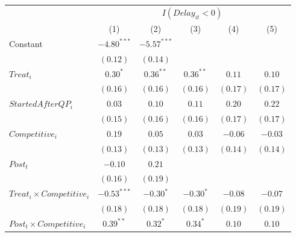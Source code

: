 \documentclass[
]{article}
\begin{document}
\begin{table}
\begin{center}
\begin{tabular}{l c c c c c}
\hline
 & \multicolumn{5}{c}{$I(Delay_{it}<0)$} \\
\cline{2-6}
 & (1) & (2) & (3) & (4) & (5) \\
\hline
Constant                                                             & $-4.80^{***}$ & $-5.57^{***}$ &             &             &             \\
                                                                     & $(0.12)$      & $(0.14)$      &             &             &             \\
$Treat_i$                                                            & $0.30^{*}$    & $0.36^{**}$   & $0.36^{**}$ & $0.11$      & $0.10$      \\
                                                                     & $(0.16)$      & $(0.16)$      & $(0.16)$    & $(0.17)$    & $(0.17)$    \\
$StartedAfterQP_i$                                                   & $0.03$        & $0.10$        & $0.11$      & $0.20$      & $0.22$      \\
                                                                     & $(0.15)$      & $(0.16)$      & $(0.16)$    & $(0.17)$    & $(0.17)$    \\
$Competitive_i$                                                      & $0.19$        & $0.05$        & $0.03$      & $-0.06$     & $-0.03$     \\
                                                                     & $(0.13)$      & $(0.13)$      & $(0.13)$    & $(0.14)$    & $(0.14)$    \\
$Post_t$                                                             & $-0.10$       & $0.21$        &             &             &             \\
                                                                     & $(0.16)$      & $(0.19)$      &             &             &             \\
$Treat_i \times Competitive_i$                                       & $-0.53^{***}$ & $-0.30^{*}$   & $-0.30^{*}$ & $-0.08$     & $-0.07$     \\
                                                                     & $(0.18)$      & $(0.18)$      & $(0.18)$    & $(0.19)$    & $(0.19)$    \\
$Post_t \times Competitive_i$                                        & $0.39^{**}$   & $0.32^{*}$    & $0.34^{*}$  & $0.10$      & $0.10$      \\

\end{tabular}
\end{center}
\end{table}
\end{document}
